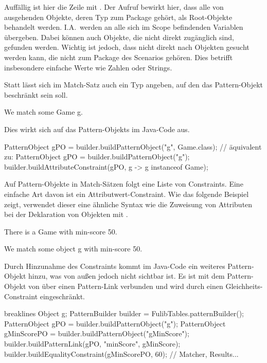 Auffällig ist hier die Zeile mit .
Der Aufruf  bewirkt hier, dass alle von  ausgehenden Objekte, deren Typ zum Package  gehört, als Root-Objekte behandelt werden.
I.A.\ werden an  alle sich im Scope befindenden Variablen übergeben.
Dabei können auch Objekte, die nicht direkt zugänglich sind, gefunden werden.
Wichtig ist jedoch, dass nicht direkt nach Objekten gesucht werden kann, die nicht zum Package des Scenarios gehören.
Dies betrifft insbesondere einfache Werte wie Zahlen oder Strings.

Statt  lässt sich im Match-Satz auch ein Typ angeben, auf den das Pattern-Objekt beschränkt sein soll.

\begin{mdcodeblock}
    We match some Game g.
\end{mdcodeblock}

Dies wirkt sich auf das Pattern-Objekts im Java-Code aus.

\begin{jcodeblock}
    PatternObject gPO = builder.buildPatternObject("g", Game.class);
    // äquivalent zu:
    PatternObject gPO = builder.buildPatternObject("g");
    builder.buildAttributeConstraint(gPO, g -> g instanceof Game);
\end{jcodeblock}

Auf Pattern-Objekte in Match-Sätzen folgt eine Liste von Constraints.
Eine einfache Art davon ist ein Attributwert-Constraint.
Wie das folgende Beispiel zeigt, verwendet dieser eine ähnliche Syntax wie die Zuweisung von Attributen bei der Deklaration von Objekten mit .

\begin{mdcodeblock}
    There is a Game with min-score 50.

    We match some object g with min-score 50.
\end{mdcodeblock}

Durch Hinzunahme des Constraints kommt im Java-Code ein weiteres Pattern-Objekt hinzu, was von außen jedoch nicht sichtbar ist.
Es ist mit dem Pattern-Objekt von  über einen Pattern-Link verbunden und wird durch einen Gleichheits-Constraint eingeschränkt.

\begin{jcodeblock*}{breaklines}
    Object g;
    {
        PatternBuilder builder = FulibTables.patternBuilder();
        PatternObject gPO = builder.buildPatternObject("g");
        PatternObject gMinScorePO = builder.buildPatternObject("gMinScore");
        builder.buildPatternLink(gPO, "minScore", gMinScore);
        builder.buildEqualityConstraint(gMinScorePO, 60);
        // Matcher, Results...
    }
\end{jcodeblock*}

